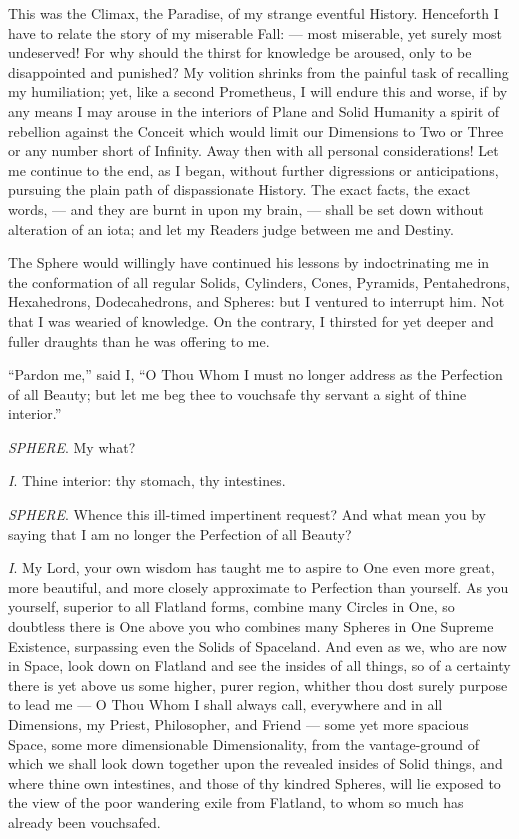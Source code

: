 \documentclass[10pt, kindle, oneside]{kindle}
\begin{document}
This was the Climax, the Paradise, of my strange eventful History. Henceforth
I have to relate the story of my miserable Fall: --- most miserable, yet surely
most undeserved! For why should the thirst for knowledge be aroused, only to
be disappointed and punished? My volition shrinks from the painful task of
recalling my humiliation; yet, like a second Prometheus, I will endure this
and worse, if by any means I may arouse in the interiors of Plane and Solid
Humanity a spirit of rebellion against the Conceit which would limit our
Dimensions to Two or Three or any number short of Infinity. Away then with all
personal considerations! Let me continue to the end, as I began, without
further digressions or anticipations, pursuing the plain path of dispassionate
History. The exact facts, the exact words, --- and they are burnt in upon my
brain, --- shall be set down without alteration of an iota; and let my Readers
judge between me and Destiny.

The Sphere would willingly have continued his lessons by indoctrinating me in
the conformation of all regular Solids, Cylinders, Cones, Pyramids,
Pentahedrons, Hexahedrons, Dodecahedrons, and Spheres: but I ventured to
interrupt him. Not that I was wearied of knowledge.  On the contrary, I
thirsted for yet deeper and fuller draughts than he was offering to me.

``Pardon me,'' said I, ``O Thou Whom I must no longer address as the Perfection
of all Beauty; but let me beg thee to vouchsafe thy servant a sight of thine
interior.''

\emph{SPHERE}. My what?

\emph{I}. Thine interior: thy stomach, thy intestines.

\emph{SPHERE}. Whence this ill-timed impertinent request? And what mean you by saying
that I am no longer the Perfection of all Beauty?

\emph{I}. My Lord, your own wisdom has taught me to aspire to One even more great,
more beautiful, and more closely approximate to Perfection than yourself. As
you yourself, superior to all Flatland forms, combine many Circles in One, so
doubtless there is One above you who combines many Spheres in One Supreme
Existence, surpassing even the Solids of Spaceland. And even as we, who are
now in Space, look down on Flatland and see the insides of all things, so of a
certainty there is yet above us some higher, purer region, whither thou dost
surely purpose to lead me --- O Thou Whom I shall always call, everywhere and in
all Dimensions, my Priest, Philosopher, and Friend --- some yet more spacious
Space, some more dimensionable Dimensionality, from the vantage-ground of
which we shall look down together upon the revealed insides of Solid things,
and where thine own intestines, and those of thy kindred Spheres, will lie
exposed to the view of the poor wandering exile from Flatland, to whom so much
has already been vouchsafed.
\end{document}
